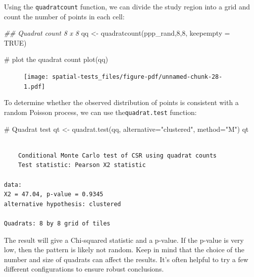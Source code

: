 \documentclass[
  letterpaper,
]{book}
\newenvironment{Shaded}{\begin{snugshade}}{\end{snugshade}}
\newcommand{\AttributeTok}[1]{\textcolor[rgb]{0.40,0.45,0.13}{#1}}
\newcommand{\CommentTok}[1]{\textcolor[rgb]{0.37,0.37,0.37}{#1}}
\newcommand{\ConstantTok}[1]{\textcolor[rgb]{0.56,0.35,0.01}{#1}}
\newcommand{\DecValTok}[1]{\textcolor[rgb]{0.68,0.00,0.00}{#1}}
\newcommand{\DocumentationTok}[1]{\textcolor[rgb]{0.37,0.37,0.37}{\textit{#1}}}
\newcommand{\FunctionTok}[1]{\textcolor[rgb]{0.28,0.35,0.67}{#1}}
\newcommand{\NormalTok}[1]{\textcolor[rgb]{0.00,0.23,0.31}{#1}}
\newcommand{\OtherTok}[1]{\textcolor[rgb]{0.00,0.23,0.31}{#1}}
\newcommand{\StringTok}[1]{\textcolor[rgb]{0.13,0.47,0.30}{#1}}
\begin{document}
Using the \texttt{quadratcount} function, we can divide the study region
into a grid and count the number of points in each cell:

\begin{Shaded}
\begin{Highlighting}[]
\DocumentationTok{\#\# Quadrat count 8 x 8}
\NormalTok{qq }\OtherTok{\textless{}{-}} \FunctionTok{quadratcount}\NormalTok{(ppp\_rand,}\DecValTok{8}\NormalTok{,}\DecValTok{8}\NormalTok{, }\AttributeTok{keepempty =} \ConstantTok{TRUE}\NormalTok{) }

\CommentTok{\# plot the quadrat count}
\FunctionTok{plot}\NormalTok{(qq)}
\end{Highlighting}
\end{Shaded}

\begin{figure}[H]

{\centering \texttt{[image: spatial-tests\_files/figure-pdf/unnamed-chunk-28-1.pdf]}

}

\end{figure}

To determine whether the observed distribution of points is consistent
with a random Poisson process, we can use the\texttt{quadrat.test}
function:

\begin{Shaded}
\begin{Highlighting}[]
\CommentTok{\# Quadrat test}
\NormalTok{qt }\OtherTok{\textless{}{-}} \FunctionTok{quadrat.test}\NormalTok{(qq, }\AttributeTok{alternative=}\StringTok{"clustered"}\NormalTok{, }\AttributeTok{method=}\StringTok{"M"}\NormalTok{)}
\NormalTok{qt}
\end{Highlighting}
\end{Shaded}

\begin{verbatim}

    Conditional Monte Carlo test of CSR using quadrat counts
    Test statistic: Pearson X2 statistic

data:  
X2 = 47.04, p-value = 0.9345
alternative hypothesis: clustered

Quadrats: 8 by 8 grid of tiles
\end{verbatim}

The result will give a Chi-squared statistic and a p-value. If the
p-value is very low, then the pattern is likely not random. Keep in mind
that the choice of the number and size of quadrats can affect the
results. It's often helpful to try a few different configurations to
ensure robust conclusions.
\end{document}
